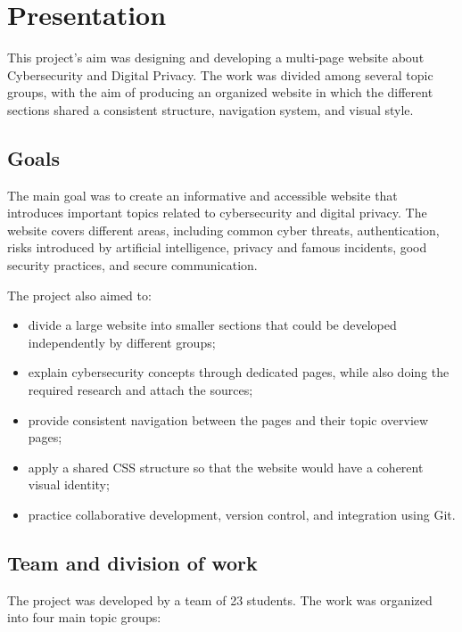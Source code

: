 \section{Presentation}
\label{sec:presentation}

This project's aim was designing and developing a multi-page website about Cybersecurity and Digital Privacy.
The work was divided among several topic groups, with the aim of producing an organized website in which the different
sections shared a consistent structure, navigation system, and visual style.

\subsection{Goals}
\label{sec:goals}

The main goal was to create an informative and accessible website that introduces important topics related to cybersecurity and digital privacy.
The website covers different areas, including common cyber threats, authentication, risks introduced by artificial intelligence, privacy and famous incidents, good security practices, and secure communication.

The project also aimed to:
\begin{itemize}

    \item divide a large website into smaller sections that could be developed
    independently by different groups;
    \item explain cybersecurity concepts through dedicated pages, while also doing the required research and attach the sources;
    \item provide consistent navigation between the pages and their topic overview pages;
    \item apply a shared CSS structure so that the website would have a coherent
    visual identity;
    \item practice collaborative development, version control, and integration
    using Git.

\end{itemize}

\subsection{Team and division of work}
\label{sec:team}

The project was developed by a team of 23 students. The work was organized into
four main topic groups:

